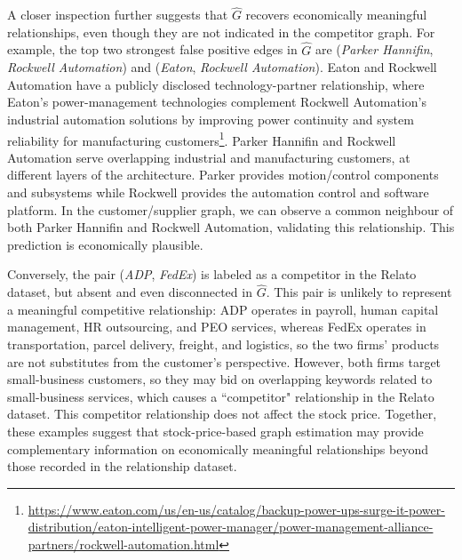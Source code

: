\documentclass[11pt,a4paper,final]{article}
\numberwithin{equation}{section}
\theoremstyle{remark}
\begin{document}
A closer inspection further suggests that $\widehat{G}$ recovers economically meaningful relationships, even though they are not indicated in the competitor graph. 
For example, the top two strongest false positive edges in $\widehat{G}$ are (\textit{Parker Hannifin}, \textit{Rockwell Automation}) and (\textit{Eaton}, \textit{Rockwell Automation}). 
Eaton and Rockwell Automation have a publicly disclosed technology-partner relationship, where Eaton's power-management technologies complement Rockwell Automation's industrial automation solutions by improving power continuity and system reliability for manufacturing customers\footnote{\url{https://www.eaton.com/us/en-us/catalog/backup-power-ups-surge-it-power-distribution/eaton-intelligent-power-manager/power-management-alliance-partners/rockwell-automation.html}}. 
Parker Hannifin and Rockwell Automation serve overlapping industrial and manufacturing customers, at different layers of the architecture. Parker provides motion/control components and subsystems while Rockwell provides the automation control and software platform. In the customer/supplier graph, we can observe a common neighbour of both Parker Hannifin and Rockwell Automation, validating this relationship. 
This prediction is economically plausible.


Conversely, the pair (\textit{ADP}, \textit{FedEx}) is labeled as a competitor in the Relato dataset, but absent and even disconnected in $\widehat G$.
This pair is unlikely to represent a meaningful competitive relationship: ADP operates in payroll, human capital management, HR outsourcing, and PEO services, whereas FedEx operates in transportation, parcel delivery, freight, and logistics, so the two firms' products are not substitutes from the customer's perspective. 
However, both firms target small-business customers, so they may bid on overlapping keywords related to small-business services, which causes a ``competitor" relationship in the Relato dataset. 
This competitor relationship does not affect the stock price.
Together, these examples suggest that stock-price-based graph estimation may provide complementary information on economically meaningful relationships beyond those recorded in the relationship dataset.
\end{document}
